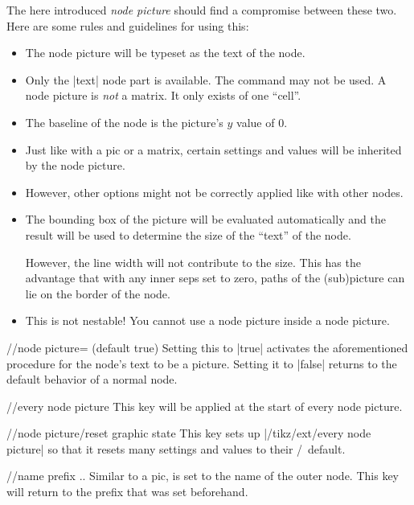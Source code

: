\begin{multicols}{2}
The here introduced \emph{node picture} should find a compromise between these two.
Here are some rules and guidelines for using this:
\begin{itemize}
\item The node picture will be typeset as the text of the node.
\item Only the |text| node part is available.
      The  command may not be used.
      A node picture is \emph{not} a matrix.
      It only exists of one \enquote{cell}.
\item The baseline of the node is the picture's $y$ value of $0$.
\item Just like with a pic or a matrix, certain settings and values will be inherited by the node picture.
\item However, other options might not be correctly applied like with other nodes.
\item The bounding box of the picture will be evaluated automatically and the result will be used to determine
      the size of the \enquote{text} of the node.

      However, the line width will not contribute to the size.
      This has the advantage that with any inner seps set to zero, paths of the (sub)picture
      can lie on the border of the node.
\item This is not nestable!
      You cannot use a node picture inside a node picture.
\end{itemize}

\newcolumn
\begin{key}{/\tikzext/node picture= (default true)}
  Setting this to |true| activates the aforementioned procedure for the node's text to be a picture.
  Setting it to |false| returns to the default behavior of a normal node.
\end{key}
\begin{stylekey}{/\tikzext/every node picture}
This key will be applied at the start of every node picture.
\end{stylekey}
\begin{key}{/\tikzext/node picture/reset graphic state}
This key sets up |/tikz/ext/every node picture| so that it resets many settings and values
to their \pgfname/\tikzname\ default.
\end{key}

\begin{key}{/\tikzext/name prefix ..}
  Similar to a pic,  is set to the name of the outer node.
  This key will return to the prefix that was set beforehand.
\end{key}
\begin{codeexample}[preamble=\usetikzlibrary{ext.nodes}]
\end{codeexample}


\end{multicols}
